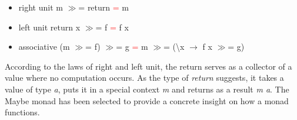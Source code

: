 \documentclass[a4paper, onecolumn]{article}
\begin{document}
\begin{itemize}
    \item right unit \hspace{20mm} m $\gg$= return \textcolor{red}{=} m 
    \item left unit \hspace{20mm} return x $\gg$= f \textcolor{red}{=} f x   
    \item associative \hspace{15mm} (m $\gg$= f) $\gg$= g \textcolor{red}{=} m $\gg$= (\textbackslash x $\rightarrow$ f x $\gg$= g) 
\end{itemize}
According to the laws of right and left unit, the return serves as a collector of a value where no computation occurs. As the type of \textit{return} suggests, it takes a value of type \textit{a}, puts it in a special context \textit{m} and returns as a result \textit{m a}.
The Maybe monad has been selected to provide a concrete insight on how a monad functions.   
\end{document}
